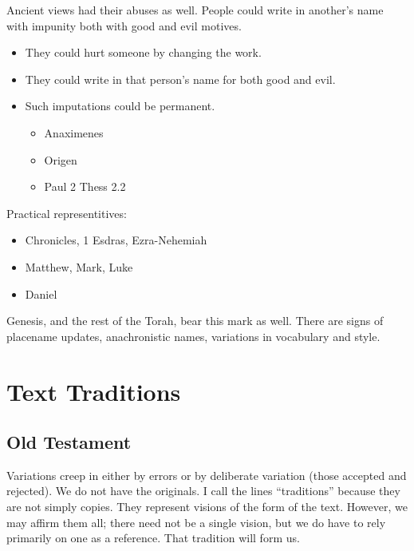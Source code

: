 \documentclass{beamer}
\begin{document}
\begin{frame}
  Ancient views had their abuses as well.
  People could write in another's name with impunity both with good and evil motives.\pause
  \begin{itemize}
	\item They could hurt someone by changing the work.\pause
	\item They could write in that person's name for both good and evil.\pause
	\item Such imputations could be permanent.\pause
	  \begin{itemize}
		\item Anaximenes\pause
		\item Origen\pause
		\item Paul 2 Thess 2.2
	  \end{itemize}
  \end{itemize}
\end{frame}

\begin{frame}
  Practical representitives:\pause
  \begin{itemize}
	\item Chronicles, 1 Esdras, Ezra-Nehemiah\pause
	\item Matthew, Mark, Luke\pause
	\item Daniel
  \end{itemize}
\end{frame}

\begin{frame}
  Genesis, and the rest of the Torah, bear this mark as well.
  There are signs of placename updates, anachronistic names, variations in vocabulary and style.
\end{frame}


\section{Text Traditions}

\subsection{Old Testament}

\begin{frame}
  Variations creep in either by errors or by deliberate variation (those accepted and rejected).
  We do not have the originals.
  I call the lines ``traditions'' because they are not simply copies.
  They represent visions of the form of the text.
  However, we may affirm them all; there need not be a single vision, but we do have to rely primarily on one as a reference.
  That tradition will form us.
\end{frame}
\end{document}
